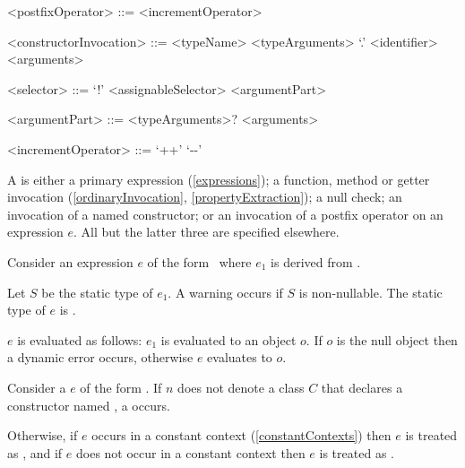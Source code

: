 \documentclass[makeidx]{article}
\begin{document}
{\begin{grammar}
<postfixOperator> ::= <incrementOperator>

<constructorInvocation> ::= \gnewline{}
  <typeName> <typeArguments> `.' <identifier> <arguments>

<selector> ::= `!'
  \alt <assignableSelector>
  \alt <argumentPart>

<argumentPart> ::=
  <typeArguments>? <arguments>

<incrementOperator> ::= `++'
  \alt `-\mbox-'
\end{grammar}

\LMHash{}%
A  is either a primary expression
(\ref{expressions});
a function, method or getter invocation
(\ref{ordinaryInvocation}, \ref{propertyExtraction});
a null check;
an invocation of a named constructor;
or an invocation of a postfix operator on an expression $e$.
All but the latter three are specified elsewhere.

\LMHash{}%
Consider an expression $e$ of the form \ where
$e_1$ is derived from .

\LMHash{}%
Let $S$ be the static type of $e_1$.
A warning occurs if $S$ is non-nullable.
The static type of $e$ is .

\LMHash{}%
$e$ is evaluated as follows: $e_1$ is evaluated to an object $o$.
If $o$ is the null object then a dynamic error occurs,
otherwise $e$ evaluates to $o$.

Consider a  $e$ of the form
.
If $n$ does not denote a class $C$
that declares a constructor named ,
a  occurs.

\LMHash{}%
Otherwise, if $e$ occurs in a constant context
(\ref{constantContexts})
then $e$ is treated as ,
and if $e$ does not occur in a constant context
then $e$ is treated as .

\EndCase

}
\end{document}
